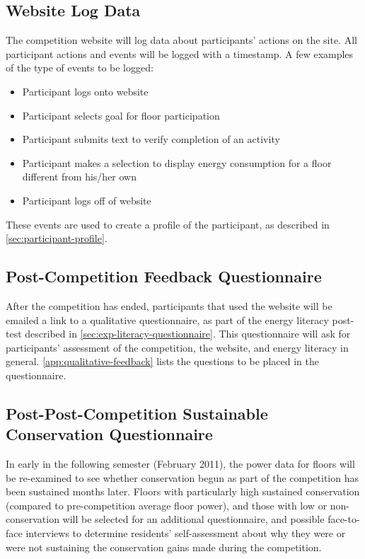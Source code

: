 \subsection{Website Log Data}

The competition website will log data about participants' actions on the site. All participant actions and events will be logged with a timestamp. A few examples of the type of events to be logged:

\begin{itemize}
\item Participant logs onto website
\item Participant selects goal for floor participation
\item Participant submits text to verify completion of an activity
\item Participant makes a selection to display energy consumption for a floor different from his/her own
\item Participant logs off of website
\end{itemize}

These events are used to create a profile of the participant, as described in \autoref{sec:participant-profile}.

\subsection{Post-Competition Feedback Questionnaire}
\label{sec:post-competition-feedback}
After the competition has ended, participants that used the website will be emailed a link to a qualitative questionnaire, as part of the energy literacy post-test described in \autoref{sec:exp-literacy-questionnaire}. This questionnaire will ask for participants' assessment of the competition, the website, and energy literacy in general. \autoref{app:qualitative-feedback} lists the questions to be placed in the questionnaire.

\subsection{Post-Post-Competition Sustainable Conservation Questionnaire}

In early in the following semester (February 2011), the power data for floors will be re-examined to see whether conservation begun as part of the competition has been sustained months later. Floors with particularly high sustained conservation (compared to pre-competition average floor power), and those with low or non-conservation will be selected for an additional questionnaire, and possible face-to-face interviews to determine residents' self-assessment about why they were or were not sustaining the conservation gains made during the competition.

